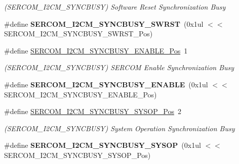 \begin{DoxyCompactItemize}
\begin{DoxyCompactList}\small\item\em (S\+E\+R\+C\+O\+M\+\_\+\+I2\+C\+M\+\_\+\+S\+Y\+N\+C\+B\+U\+S\+Y) Software Reset Synchronization Busy \end{DoxyCompactList}\item 
\hypertarget{group___s_a_m_l21___s_e_r_c_o_m_ga5ce8e6049a84583cfcf59746a360123b}{}\#define {\bfseries S\+E\+R\+C\+O\+M\+\_\+\+I2\+C\+M\+\_\+\+S\+Y\+N\+C\+B\+U\+S\+Y\+\_\+\+S\+W\+R\+S\+T}~(0x1ul $<$$<$ S\+E\+R\+C\+O\+M\+\_\+\+I2\+C\+M\+\_\+\+S\+Y\+N\+C\+B\+U\+S\+Y\+\_\+\+S\+W\+R\+S\+T\+\_\+\+Pos)\label{group___s_a_m_l21___s_e_r_c_o_m_ga5ce8e6049a84583cfcf59746a360123b}

\item 
\hypertarget{group___s_a_m_l21___s_e_r_c_o_m_gabca5a56501c3055e38ef4d0b2c5f74c3}{}\#define \hyperlink{group___s_a_m_l21___s_e_r_c_o_m_gabca5a56501c3055e38ef4d0b2c5f74c3}{S\+E\+R\+C\+O\+M\+\_\+\+I2\+C\+M\+\_\+\+S\+Y\+N\+C\+B\+U\+S\+Y\+\_\+\+E\+N\+A\+B\+L\+E\+\_\+\+Pos}~1\label{group___s_a_m_l21___s_e_r_c_o_m_gabca5a56501c3055e38ef4d0b2c5f74c3}

\begin{DoxyCompactList}\small\item\em (S\+E\+R\+C\+O\+M\+\_\+\+I2\+C\+M\+\_\+\+S\+Y\+N\+C\+B\+U\+S\+Y) S\+E\+R\+C\+O\+M Enable Synchronization Busy \end{DoxyCompactList}\item 
\hypertarget{group___s_a_m_l21___s_e_r_c_o_m_ga6ab980373779ddd0b05d75426900d912}{}\#define {\bfseries S\+E\+R\+C\+O\+M\+\_\+\+I2\+C\+M\+\_\+\+S\+Y\+N\+C\+B\+U\+S\+Y\+\_\+\+E\+N\+A\+B\+L\+E}~(0x1ul $<$$<$ S\+E\+R\+C\+O\+M\+\_\+\+I2\+C\+M\+\_\+\+S\+Y\+N\+C\+B\+U\+S\+Y\+\_\+\+E\+N\+A\+B\+L\+E\+\_\+\+Pos)\label{group___s_a_m_l21___s_e_r_c_o_m_ga6ab980373779ddd0b05d75426900d912}

\item 
\hypertarget{group___s_a_m_l21___s_e_r_c_o_m_gaaf10e07af1f2ffa651601691ddd2f381}{}\#define \hyperlink{group___s_a_m_l21___s_e_r_c_o_m_gaaf10e07af1f2ffa651601691ddd2f381}{S\+E\+R\+C\+O\+M\+\_\+\+I2\+C\+M\+\_\+\+S\+Y\+N\+C\+B\+U\+S\+Y\+\_\+\+S\+Y\+S\+O\+P\+\_\+\+Pos}~2\label{group___s_a_m_l21___s_e_r_c_o_m_gaaf10e07af1f2ffa651601691ddd2f381}

\begin{DoxyCompactList}\small\item\em (S\+E\+R\+C\+O\+M\+\_\+\+I2\+C\+M\+\_\+\+S\+Y\+N\+C\+B\+U\+S\+Y) System Operation Synchronization Busy \end{DoxyCompactList}\item 
\hypertarget{group___s_a_m_l21___s_e_r_c_o_m_gaa4f6c068baa7bfcf117d457a5ab54e05}{}\#define {\bfseries S\+E\+R\+C\+O\+M\+\_\+\+I2\+C\+M\+\_\+\+S\+Y\+N\+C\+B\+U\+S\+Y\+\_\+\+S\+Y\+S\+O\+P}~(0x1ul $<$$<$ S\+E\+R\+C\+O\+M\+\_\+\+I2\+C\+M\+\_\+\+S\+Y\+N\+C\+B\+U\+S\+Y\+\_\+\+S\+Y\+S\+O\+P\+\_\+\+Pos)\label{group___s_a_m_l21___s_e_r_c_o_m_gaa4f6c068baa7bfcf117d457a5ab54e05}


\end{DoxyCompactItemize}
